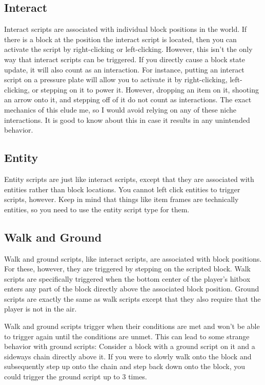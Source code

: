 \documentclass[oneside]{book}
\begin{document}
\subsection{Interact}

Interact scripts are associated with individual block positions in the world. If there is a block at the position the interact script is located, then you can activate the script by right-clicking or left-clicking. However, this isn't the only way that interact scripts can be triggered. If you directly cause a block state update, it will also count as an interaction. For instance, putting an interact script on a pressure plate will allow you to activate it by right-clicking, left-clicking, or stepping on it to power it. However, dropping an item on it, shooting an arrow onto it, and stepping off of it do not count as interactions. The exact mechanics of this elude me, so I would avoid relying on any of these niche interactions. It is good to know about this in case it results in any unintended behavior.

\subsection{Entity}

Entity scripts are just like interact scripts, except that they are associated with entities rather than block locations. You cannot left click entities to trigger scripts, however. Keep in mind that things like item frames are technically entities, so you need to use the entity script type for them.

\subsection{Walk and Ground}

Walk and ground scripts, like interact scripts, are associated with block positions. For these, however, they are triggered by stepping on the scripted block. Walk scripts are specifically triggered when the bottom center of the player's hitbox enters any part of the block directly above the associated block position. Ground scripts are exactly the same as walk scripts except that they also require that the player is not in the air.

Walk and ground scripts trigger when their conditions are met and won't be able to trigger again until the conditions are unmet. This can lead to some strange behavior with ground scripts: Consider a block with a ground script on it and a sideways chain directly above it. If you were to slowly walk onto the block and subsequently step up onto the chain and step back down onto the block, you could trigger the ground script up to 3 times.
\end{document}
